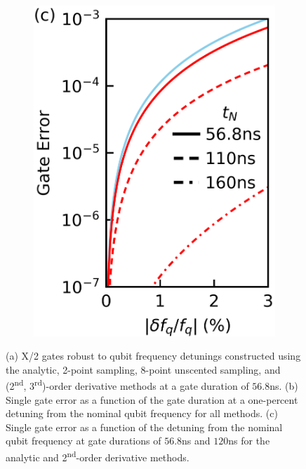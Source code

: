 \documentclass[
  amsfonts,
  amsmath,
  tbtags,
  amssymb,
  aps,
  nobibnotes,
  twocolumn,
  superscriptaddress,
]{revtex4-2}
\begin{document}
\begin{figure}[ht]
  \begin{subfigure}{.23\textwidth}
    \includegraphics[width=\linewidth]{assets/f2b.png}
  \end{subfigure}
  
  \caption{
    (a) X/2 gates robust to qubit frequency detunings constructed using the
    analytic, 2-point sampling, 8-point unscented sampling, and (2\textsuperscript{nd},
    3\textsuperscript{rd})-order derivative methods at a gate duration of $56.8$ns.
    (b) Single gate error as
    a function of the gate duration at a one-percent
    detuning from the nominal qubit frequency for all methods.
    (c) Single gate error as a function of the detuning from the nominal
    qubit frequency at gate durations of $56.8$ns and $120$ns for the analytic
    and 2\textsuperscript{nd}-order derivative methods.
  }
\end{figure}
\end{document}
